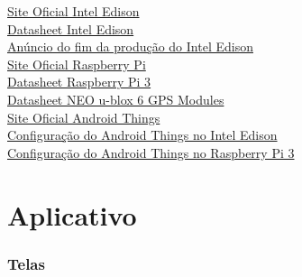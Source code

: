 \documentclass[a4paper, 12pt]{article}
\begin{document}
\href{https://software.intel.com/en-us/iot/hardware/edison}{Site Oficial Intel Edison}\\
\href{http://download.intel.com/support/edison/sb/edisonmodule_hg_331189004.pdf}{Datasheet Intel Edison}\\
\href{https://www.embarcados.com.br/placas-intel-edison-galileo-e-joule-serao-descontinuadas/}{Anúncio do fim da produção do Intel Edison}\\
\href{https://www.raspberrypi.org/products/raspberry-pi-3-model-b/}{Site Oficial Raspberry Pi}\\
\href{https://www.raspberrypi.org/documentation/hardware/computemodule/RPI-CM-DATASHEET-V1_0.pdf}{Datasheet Raspberry Pi 3}\\
\href{https://www.u-blox.com/sites/default/files/products/documents/NEO-6_DataSheet_(GPS.G6-HW-09005).pdf}{Datasheet NEO u-blox 6 GPS Modules}\\
\href{https://developer.android.com/things/index.html}{Site Oficial Android Things}\\
\href{https://developer.android.com/things/hardware/edison.html}{Configuração do Android Things no Intel Edison}\\
\href{https://developer.android.com/things/hardware/raspberrypi.html}{Configuração do Android Things no Raspberry Pi 3}\\

\section{Aplicativo}

\subsubsection{Telas}
\end{document}

